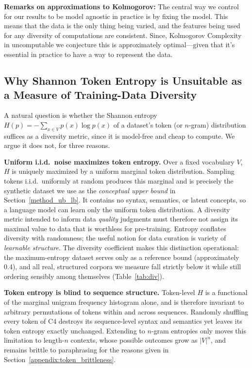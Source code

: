 \textbf{Remarks on approximations to Kolmogorov: }
The central way we control for our results to be model agnostic in practice is by fixing the model. 
This means that the data is the only thing being varied, and the features being used for any diversity of computations are consistent. 
Since, Kolmogorov Complexity in uncomputable we conjecture this is approximately optimal---given that it's essential in practice to have a way to represent the data.

\subsection{Why Shannon Token Entropy is Unsuitable as a Measure of Training-Data Diversity}
\label{appendix:entropy_not_diversity}
A natural question is whether the Shannon entropy $H(p) = -\sum_{x \in V} p(x) \log p(x)$ of a dataset's token (or $n$-gram) distribution suffices as a diversity metric, since it is model-free and cheap to compute.
We argue it does not, for three reasons.

\textbf{Uniform i.i.d.\ noise maximizes token entropy.}
Over a fixed vocabulary $V$, $H$ is uniquely maximized by a uniform marginal token distribution.
Sampling tokens i.i.d.\ uniformly at random produces this marginal and is precisely the synthetic dataset we use as the \emph{conceptual upper bound} in Section~\ref{method_ub_lb}.
It contains no syntax, semantics, or latent concepts, so a language model can learn only the uniform token distribution.
A diversity metric intended to inform data \emph{quality} judgments must therefore not assign its maximal value to data that is worthless for pre-training.
Entropy conflates diversity with randomness; the useful notion for data curation is variety of \emph{learnable structure}.
The diversity coefficient makes this distinction operational: the maximum-entropy dataset serves only as a reference bound (approximately 0.4), and all real, structured corpora we measure fall strictly below it while still ordering sensibly among themselves (Table~\ref{tab:div}).

\textbf{Token entropy is blind to sequence structure.}
Token-level $H$ is a functional of the marginal unigram frequency histogram alone, and is therefore invariant to arbitrary permutations of tokens within and across sequences.
Randomly shuffling every token of C4 destroys its sequence-level syntax and semantics yet leaves its token entropy exactly unchanged.
Extending to $n$-gram entropies only moves this limitation to length-$n$ contexts, whose possible outcomes grow as $|V|^n$, and remains brittle to paraphrasing for the reasons given in Section~\ref{appendix:token_brittleness}.

